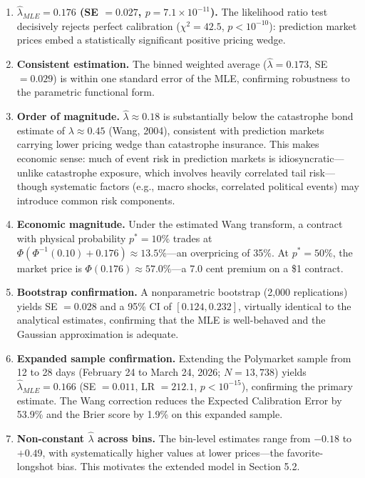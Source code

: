 \documentclass[12pt,a4paper]{article}
\begin{document}
\begin{enumerate}
\def\labelenumi{\arabic{enumi}.}
\item
  \textbf{\(\hat{\lambda}_{MLE} = 0.176\) (SE \(= 0.027\),
  \(p = 7.1 \times 10^{-11}\)).} The likelihood ratio test decisively
  rejects perfect calibration (\(\chi^2 = 42.5\), \(p < 10^{-10}\)):
  prediction market prices embed a statistically significant positive
  pricing wedge.
\item
  \textbf{Consistent estimation.} The binned weighted average
  (\(\hat{\lambda} = 0.173\), SE \(= 0.029\)) is within one standard
  error of the MLE, confirming robustness to the parametric functional
  form.
\item
  \textbf{Order of magnitude.} \(\hat{\lambda} \approx 0.18\) is
  substantially below the catastrophe bond estimate of
  \(\lambda \approx 0.45\) (Wang, 2004), consistent with prediction
  markets carrying lower pricing wedge than catastrophe insurance. This
  makes economic sense: much of event risk in prediction markets is
  idiosyncratic---unlike catastrophe exposure, which involves heavily
  correlated tail risk---though systematic factors (e.g., macro shocks,
  correlated political events) may introduce common risk components.
\item
  \textbf{Economic magnitude.} Under the estimated Wang transform, a
  contract with physical probability \(p^* = 10\%\) trades at
  \(\Phi(\Phi^{-1}(0.10) + 0.176) \approx 13.5\%\)---an overpricing of
  35\%. At \(p^* = 50\%\), the market price is
  \(\Phi(0.176) \approx 57.0\%\)---a 7.0 cent premium on a \$1 contract.
\item
  \textbf{Bootstrap confirmation.} A nonparametric bootstrap (2,000
  replications) yields SE \(= 0.028\) and a 95\% CI of
  \([0.124, 0.232]\), virtually identical to the analytical estimates,
  confirming that the MLE is well-behaved and the Gaussian approximation
  is adequate.
\item
  \textbf{Expanded sample confirmation.} Extending the Polymarket sample
  from 12 to 28 days (February 24 to March 24, 2026; \(N = 13{,}738\))
  yields \(\hat{\lambda}_{MLE} = 0.166\) (SE \(= 0.011\), LR
  \(= 212.1\), \(p < 10^{-15}\)), confirming the primary estimate. The
  Wang correction reduces the Expected Calibration Error by 53.9\% and
  the Brier score by 1.9\% on this expanded sample.
\item
  \textbf{Non-constant \(\hat{\lambda}\) across bins.} The bin-level
  estimates range from \(-0.18\) to \(+0.49\), with systematically
  higher values at lower prices---the favorite-longshot bias. This
  motivates the extended model in Section 5.2.
\end{enumerate}
\end{document}
